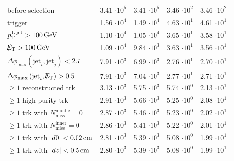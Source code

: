 \begin{table}[!h]
{\begin{tabular}{|l|c|c|c|c|}
before selection                                                                          & 3.41 $\cdot10^{5 }$ & 3.41 $\cdot10^{5 }$ & 3.46 $\cdot10^{2 }$ & 3.46 $\cdot10^{2 }$ \\
trigger                                                                                   & 1.56 $\cdot10^{4 }$ & 1.49 $\cdot10^{4 }$ & 4.63 $\cdot10^{1 }$ & 4.61 $\cdot10^{1 }$ \\
$p_{\text{T}}^{\text{1.\,jet}}>100\,\text{Ge}\kern-0.06667em\text{V}$                                                                     & 1.10 $\cdot10^{4 }$ & 1.05 $\cdot10^{4 }$ & 3.65 $\cdot10^{1 }$ & 3.58 $\cdot10^{1 }$ \\
$\slash\mkern-12mu{E}_{\text{T}}>100\,\text{Ge}\kern-0.06667em\text{V}$                                                                            & 1.09 $\cdot10^{4 }$ & 9.84 $\cdot10^{3 }$ & 3.63 $\cdot10^{1 }$ & 3.56 $\cdot10^{1 }$ \\
$\Delta\phi_{\text{max}} \left( \text{jet}_i, \text{jet}_j  \right)<2.7$                     & 7.91 $\cdot10^{3 }$ & 6.99 $\cdot10^{3 }$ & 2.76 $\cdot10^{1 }$ & 2.70 $\cdot10^{1 }$ \\
$\Delta\phi_{\text{max}} \left( \text{jet}_i, \slash\mkern-12mu{E}_{\text{T}}  \right)>0.5$                             & 7.91 $\cdot10^{3 }$ & 7.04 $\cdot10^{3 }$ & 2.77 $\cdot10^{1 }$ & 2.71 $\cdot10^{1 }$ \\
$\geq1$ reconstructed trk                                                                 & 3.13 $\cdot10^{3 }$ & 5.75 $\cdot10^{3 }$ & 5.74 $\cdot10^{0 }$ & 2.13 $\cdot10^{1 }$ \\
$\geq1$ high-purity trk                                                                   & 2.91 $\cdot10^{3 }$ & 5.66 $\cdot10^{3 }$ & 5.25 $\cdot10^{0 }$ & 2.08 $\cdot10^{1 }$ \\
$\geq1$ trk with $N_{\text{miss}}^{\text{middle}}=0$                                      & 2.87 $\cdot10^{3 }$ & 5.46 $\cdot10^{3 }$ & 5.23 $\cdot10^{0 }$ & 2.02 $\cdot10^{1 }$ \\
$\geq1$ trk with $N_{\text{miss}}^{\text{inner}}=0$                                       & 2.86 $\cdot10^{3 }$ & 5.41 $\cdot10^{3 }$ & 5.22 $\cdot10^{0 }$ & 2.01 $\cdot10^{1 }$ \\
$\geq1$ trk with $|d0|<0.02\,\text{cm}$                                                           & 2.81 $\cdot10^{3 }$ & 5.39 $\cdot10^{3 }$ & 5.08 $\cdot10^{0 }$ & 1.99 $\cdot10^{1 }$ \\
$\geq1$ trk with $|dz|<0.5\,\text{cm}$                                                            & 2.80 $\cdot10^{3 }$ & 5.39 $\cdot10^{3 }$ & 5.08 $\cdot10^{0 }$ & 1.99 $\cdot10^{1 }$ \\

\end{tabular}}
\end{table}
